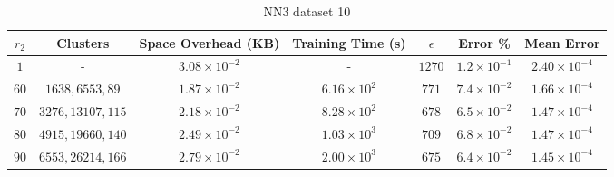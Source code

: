 \par\null\par
\par\null\par

\begin{adjustwidth}{-1.5cm}{}
\begin{table}
\caption{NN3 dataset 10}\label{ws310}
\begin{tabular}{ccccccc}
\hline
\toprule
$r_2$ & Clusters & Space Overhead (KB) & Training Time (s) & $\epsilon$ & Error \% & Mean Error\\
\midrule
$1$  & - & $3.08 \times 10^{-2}$ & - & $1270$ & $1.2 \times 10^{-1}$ & $2.40 \times 10^{-4}$\\
$60$ & $1638, 6553, 89$ & $1.87 \times 10^{-2}$ & $6.16 \times 10^2$ & $771$ & $7.4 \times 10^{-2}$ & $1.66 \times 10^{-4}$\\
$70$ & $3276, 13107, 115$ & $2.18 \times 10^{-2}$ & $8.28 \times 10^2$ & $678$ & $6.5 \times 10^{-2}$ & $1.47 \times 10^{-4}$\\
$80$ & $4915, 19660, 140$ & $2.49 \times 10^{-2}$ & $1.03 \times 10^3$ & $709$ & $6.8 \times 10^{-2}$ & $1.47 \times 10^{-4}$\\
$90$ & $6553, 26214, 166$ & $2.79 \times 10^{-2}$ & $2.00 \times 10^3$ & $675$ & $6.4 \times 10^{-2}$ & $1.45 \times 10^{-4}$\\
\bottomrule
\end{tabular}
\end{table}
\end{adjustwidth}

\par\null\par
\par\null\par